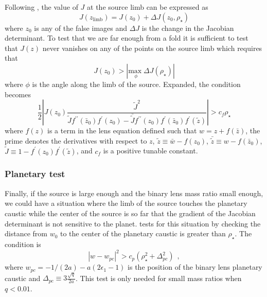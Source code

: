 \documentclass[12pt,dvipsnames]{report}
\newcommand{\hquad}{~~}
\begin{document}
Following \citet{2018MNRAS.479.5157B}, the value of $J$ at the source limb can be 
expressed as 
\begin{equation}
    J(z_\mathrm{limb})=J(z_0)+\Delta J(z_0,\rho_\star)
\end{equation}
where $z_0$ is any of the false images and $\Delta J$ is the change in the Jacobian 
determinant.
To test that we are far enough from a fold it is sufficient to test that $J(z)$ never 
vanishes on any of the points on the source limb which requires that 
\citep{2018MNRAS.479.5157B}
\begin{equation}
    J(z_0)>|\underset{\phi}{\mathrm{max}\;}\Delta J(\rho_\star)|
\end{equation}
where $\phi$ is the angle along the limb of the source.
Expanded, the condition becomes
\begin{equation}
\frac{1}{2}\left| J\left(z_0\right) \frac{\tilde{J}^{2}}{\tilde{J} 
f^{\prime \prime}\left(\bar{z}_0\right) f^{\prime}\left(z_0\right)-\bar{\tilde{J}} 
f^{\prime \prime}\left(z_0\right) f^{\prime}\left(\bar{z}_0\right) f^{\prime}
(\tilde{z})}\right|>c_f \rho_\star
\end{equation}
where $f(z)$ is a term in the lens equation defined such that $w=z + f(\bar{z})$, the prime
 denotes the  derivatives with respect to $z$, $\tilde{z}\equiv \bar{w}-f(z_0)$, 
$\bar{\tilde{z}}\equiv w - f(\bar{z}_0)$, $\tilde{J}\equiv 1 - f^\prime(z_0)f^\prime(\tilde{z})$,
and $c_f$ is a positive tunable constant.

\subsubsection{Planetary test}
Finally, if the source is large enough and the binary lens mass ratio small enough, we 
could have a situation where the limb of the source touches the planetary caustic while 
the center of the source is so far that the gradient of the Jacobian determinant is not 
sensitive to the planet. \citep{2018MNRAS.479.5157B} tests for this situation by checking 
the distance from $w_0$ to the center of the planetary caustic is greater than $\rho_\star$. 
The condition is
\begin{equation}
\left|w-w_{p c}\right|^{2}>c_p\left(\rho_\star^{2}+\Delta_{p c}^{2}\right)\hquad ,
\end{equation}
where $w_{pc}=-1/(2a)-a(2\epsilon_1 - 1)$ is the position of the binary lens planetary 
caustic and $\Delta_{pc}\equiv 3\frac{\sqrt{q}}{2a}$. This test is only needed for small 
mass ratios when $q<0.01$. 
\end{document}
